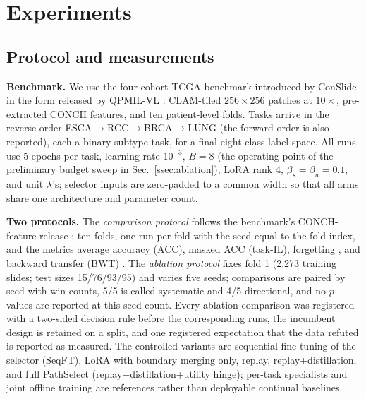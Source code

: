 \documentclass{article}
\begin{document}
\section{Experiments}
\label{sec:exp}

\subsection{Protocol and measurements}

\textbf{Benchmark.}
We use the four-cohort TCGA benchmark introduced by ConSlide \cite{huang2023conslide} in the form released by QPMIL-VL \cite{gou2025qpmil}: CLAM-tiled $256\times256$ patches at $10\times$, pre-extracted CONCH features, and ten patient-level folds. Tasks arrive in the reverse order ESCA$\rightarrow$RCC$\rightarrow$BRCA$\rightarrow$LUNG (the forward order is also reported), each a binary subtype task, for a final eight-class label space. All runs use 5 epochs per task, learning rate $10^{-3}$, $B=8$ (the operating point of the preliminary budget sweep in Sec.~\ref{ssec:ablation}), LoRA rank 4, $\beta_s{=}\beta_u{=}0.1$, and unit $\lambda$'s; selector inputs are zero-padded to a common width so that all arms share one architecture and parameter count.

\textbf{Two protocols.}
The \emph{comparison protocol} follows the benchmark's CONCH-feature release \cite{gou2025qpmil}: ten folds, one run per fold with the seed equal to the fold index, and the metrics average accuracy (ACC), masked ACC (task-IL), forgetting \cite{chaudhry2018rwalk}, and backward transfer (BWT) \cite{lopezpaz2017gem}. The \emph{ablation protocol} fixes fold 1 (2,273 training slides; test sizes 15/76/93/95) and varies five seeds; comparisons are paired by seed with win counts, 5/5 is called systematic and 4/5 directional, and no $p$-values are reported at this seed count. Every ablation comparison was registered with a two-sided decision rule before the corresponding runs, the incumbent design is retained on a split, and one registered expectation that the data refuted is reported as measured. The controlled variants are sequential fine-tuning of the selector (SeqFT), LoRA with boundary merging only, replay, replay+distillation, and full PathSelect (replay+distillation+utility hinge); per-task specialists and joint offline training are references rather than deployable continual baselines.
\end{document}
